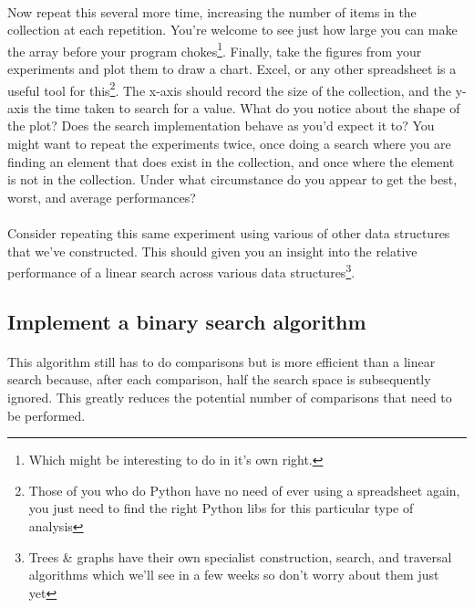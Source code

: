 \documentclass[10pt, a4paper, twosize]{article}
\begin{document}
\paragraph{} Now repeat this several more time, increasing the number of items in the collection at each repetition. You're welcome to see just how large you can make the array before your program chokes\footnote{Which might be interesting to do in it's own right.}. Finally, take the figures from your experiments and plot them to draw a chart. Excel, or any other spreadsheet is a useful tool for this\footnote{Those of you who do Python have no need of ever using a spreadsheet again, you just need to find the right Python libs for this particular type of analysis}. The x-axis should record the size of the collection, and the y-axis the time taken to search for a value. What do you notice about the shape of the plot? Does the search implementation behave as you'd expect it to? You might want to repeat the experiments twice, once doing a search where you are finding an element that does exist in the collection, and once where the element is not in the collection. Under what circumstance do you appear to get the best, worst, and average performances?

\paragraph{} Consider repeating this same experiment using various of other data structures that we've constructed. This should given you an insight into the relative performance of a linear search across various data structures\footnote{Trees \& graphs have their own specialist construction, search, and traversal algorithms which we'll see in a few weeks so don't worry about them just yet}.



\subsection{Implement a binary search algorithm}

\paragraph{} This algorithm still has to do comparisons but is more efficient than a linear search because, after each comparison, half the search space is subsequently ignored. This greatly reduces the potential number of comparisons that need to be performed.
\end{document}
